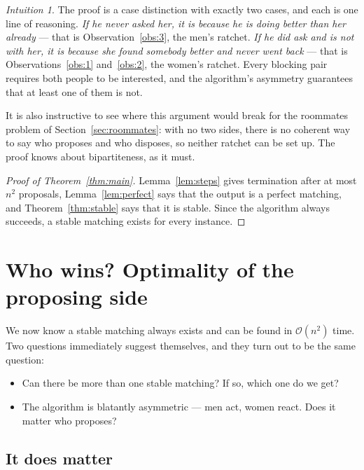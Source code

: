 \documentclass[11pt,a4paper]{article}
\theoremstyle{plain}
\theoremstyle{definition}
\theoremstyle{remark}
\newtheorem*{intuition}{Intuition}
\newcommand{\bigoh}[1]{\mathcal{O}\!\left(#1\right)}
\begin{document}
\begin{intuition}
The proof is a case distinction with exactly two cases, and each is one line
of reasoning. \emph{If he never asked her, it is because he is doing better
than her already} --- that is Observation~\ref{obs:3}, the men's ratchet.
\emph{If he did ask and is not with her, it is because she found somebody
better and never went back} --- that is Observations~\ref{obs:1}
and~\ref{obs:2}, the women's ratchet. Every blocking pair requires both people
to be interested, and the algorithm's asymmetry guarantees that at least one
of them is not.

It is also instructive to see where this argument would break for the
roommates problem of Section~\ref{sec:roommates}: with no two sides, there is
no coherent way to say who proposes and who disposes, so neither ratchet can
be set up. The proof knows about bipartiteness, as it must.
\end{intuition}

\begin{proof}[Proof of Theorem~\ref{thm:main}]
Lemma~\ref{lem:steps} gives termination after at most $n^2$ proposals,
Lemma~\ref{lem:perfect} says that the output is a perfect matching, and
Theorem~\ref{thm:stable} says that it is stable. Since the algorithm always
succeeds, a stable matching exists for every instance.
\end{proof}

\section{Who wins? Optimality of the proposing side}\label{sec:optimality}

We now know a stable matching always exists and can be found in $\bigoh{n^2}$
time. Two questions immediately suggest themselves, and they turn out to be
the same question:

\begin{itemize}[nosep]
  \item Can there be more than one stable matching? If so, which one do we get?
  \item The algorithm is blatantly asymmetric --- men act, women react. Does it
        matter who proposes?
\end{itemize}

\subsection{It does matter}
\end{document}
